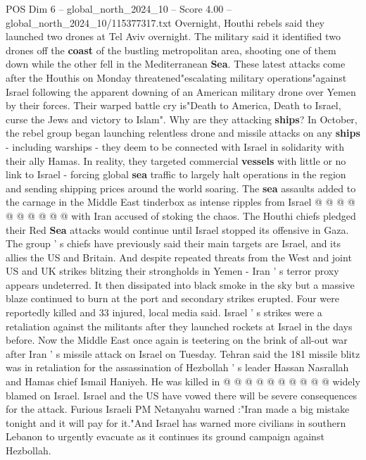 \begin{textsample}{POS Dim 6 – global\_north\_2024\_10 – Score 4.00 – global\_north\_2024\_10/115377317.txt}  \label{ex:f6_pos_379}
Overnight, Houthi rebels said they launched two drones at Tel Aviv overnight.
The military said it identified two drones off the \textbf{coast} of the bustling metropolitan area, shooting one of them down while the other fell in the Mediterranean \textbf{Sea}.
These latest attacks come after the Houthis on Monday threatened"escalating military operations"against Israel following the apparent downing of an American military drone over Yemen by their forces.
Their warped battle cry is"Death to America, Death to Israel, curse the Jews and victory to Islam".
Why are they attacking \textbf{ships}?
In October, the rebel group began launching relentless drone and missile attacks on any \textbf{ships} - including warships - they deem to be connected with Israel in solidarity with their ally Hamas.
In reality, they targeted commercial \textbf{vessels} with little or no link to Israel - forcing global \textbf{sea} traffic to largely halt operations in the region and sending shipping prices around the world soaring.
The \textbf{sea} assaults added to the carnage in the Middle East tinderbox as intense ripples from Israel @ @ @ @ @ @ @ @ @ @ with Iran accused of stoking the chaos.
The Houthi chiefs pledged their Red \textbf{Sea} attacks would continue until Israel stopped its offensive in Gaza.
The group ' s chiefs have previously said their main targets are Israel, and its allies the US and Britain.
And despite repeated threats from the West and joint US and UK strikes blitzing their strongholds in Yemen - Iran ' s terror proxy appears undeterred.
It then dissipated into black smoke in the sky but a massive blaze continued to burn at the port and secondary strikes erupted.
Four were reportedly killed and 33 injured, local media said.
Israel ' s strikes were a retaliation against the militants after they launched rockets at Israel in the days before.
Now the Middle East once again is teetering on the brink of all-out war after Iran ' s missile attack on Israel on Tuesday.
Tehran said the 181 missile blitz was in retaliation for the assassination of Hezbollah ' s leader Hassan Nasrallah and Hamas chief Ismail Haniyeh.
He was killed in @ @ @ @ @ @ @ @ @ @ widely blamed on Israel.
Israel and the US have vowed there will be severe consequences for the attack.
Furious Israeli PM Netanyahu warned :"Iran made a big mistake tonight and it will pay for it."And Israel has warned more civilians in southern Lebanon to urgently evacuate as it continues its ground campaign against Hezbollah.

\end{textsample}
